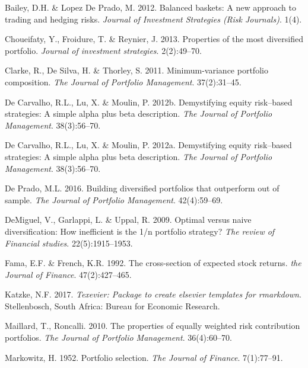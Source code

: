 \documentclass[11pt,preprint, authoryear]{elsarticle}
\numberwithin{equation}{section}
\numberwithin{figure}{section}
\numberwithin{table}{section}
\newlength{\cslhangindent}
\newenvironment{CSLReferences}%
  {\setlength{\parindent}{0pt}%
  \everypar{\setlength{\hangindent}{\cslhangindent}}\ignorespaces}%
  {\par}
\begin{document}
\hypertarget{refs}{}
\begin{CSLReferences}{1}{0}
\leavevmode\hypertarget{ref-lopez2012}{}%
Bailey, D.H. \& Lopez De Prado, M. 2012. Balanced baskets: A new
approach to trading and hedging risks. \emph{Journal of Investment
Strategies (Risk Journals)}. 1(4).

\leavevmode\hypertarget{ref-choueifaty2013}{}%
Choueifaty, Y., Froidure, T. \& Reynier, J. 2013. Properties of the most
diversified portfolio. \emph{Journal of investment strategies}.
2(2):49--70.

\leavevmode\hypertarget{ref-clarke2011}{}%
Clarke, R., De Silva, H. \& Thorley, S. 2011. Minimum-variance portfolio
composition. \emph{The Journal of Portfolio Management}. 37(2):31--45.

\leavevmode\hypertarget{ref-leote}{}%
De Carvalho, R.L., Lu, X. \& Moulin, P. 2012b. Demystifying equity
risk--based strategies: A simple alpha plus beta description. \emph{The
Journal of Portfolio Management}. 38(3):56--70.

\leavevmode\hypertarget{ref-rawl2012}{}%
De Carvalho, R.L., Lu, X. \& Moulin, P. 2012a. Demystifying equity
risk--based strategies: A simple alpha plus beta description. \emph{The
Journal of Portfolio Management}. 38(3):56--70.

\leavevmode\hypertarget{ref-lopez}{}%
De Prado, M.L. 2016. Building diversified portfolios that outperform out
of sample. \emph{The Journal of Portfolio Management}. 42(4):59--69.

\leavevmode\hypertarget{ref-demiguel2009}{}%
DeMiguel, V., Garlappi, L. \& Uppal, R. 2009. Optimal versus naive
diversification: How inefficient is the 1/n portfolio strategy?
\emph{The review of Financial studies}. 22(5):1915--1953.

\leavevmode\hypertarget{ref-fama1992}{}%
Fama, E.F. \& French, K.R. 1992. The cross-section of expected stock
returns. \emph{the Journal of Finance}. 47(2):427--465.

\leavevmode\hypertarget{ref-Texevier}{}%
Katzke, N.F. 2017. \emph{{Texevier}: {P}ackage to create elsevier
templates for rmarkdown}. Stellenbosch, South Africa: Bureau for
Economic Research.

\leavevmode\hypertarget{ref-maillard2010}{}%
Maillard, T., Roncalli. 2010. The properties of equally weighted risk
contribution portfolios. \emph{The Journal of Portfolio Management}.
36(4):60--70.

\leavevmode\hypertarget{ref-markowitz}{}%
Markowitz, H. 1952. Portfolio selection. \emph{The Journal of Finance}.
7(1):77--91.

\end{CSLReferences}


\end{document}
